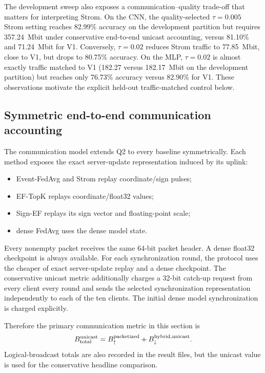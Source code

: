 The development sweep also exposes a communication--quality trade-off that matters for interpreting Strom. On the CNN, the quality-selected $\tau=0.005$ Strom setting reaches 82.99\% accuracy on the development partition but requires 357.24~Mbit under conservative end-to-end unicast accounting, versus 81.10\% and 71.24~Mbit for V1. Conversely, $\tau=0.02$ reduces Strom traffic to 77.85~Mbit, close to V1, but drops to 80.75\% accuracy. On the MLP, $\tau=0.02$ is almost exactly traffic matched to V1 (182.27 versus 182.17~Mbit on the development partition) but reaches only 76.73\% accuracy versus 82.90\% for V1. These observations motivate the explicit held-out traffic-matched control below.

\subsection{Symmetric end-to-end communication accounting}

The communication model extends Q2 to every baseline symmetrically. Each method exposes the exact server-update representation induced by its uplink:
\begin{itemize}
    \item Event-FedAvg and Strom replay coordinate/sign pulses;
    \item EF-TopK replays coordinate/float32 values;
    \item Sign-EF replays its sign vector and floating-point scale;
    \item dense FedAvg uses the dense model state.
\end{itemize}
Every nonempty packet receives the same 64-bit packet header. A dense float32 checkpoint is always available. For each synchronization round, the protocol uses the cheaper of exact server-update replay and a dense checkpoint. The conservative unicast metric additionally charges a 32-bit catch-up request from every client every round and sends the selected synchronization representation independently to each of the ten clients. The initial dense model synchronization is charged explicitly.

Therefore the primary communication metric in this section is
\begin{equation}
    B_{\rm total}^{\rm unicast}
    =B_{\uparrow}^{\rm packetized}+B_{\downarrow}^{\rm hybrid,unicast}.
\end{equation}
Logical-broadcast totals are also recorded in the result files, but the unicast value is used for the conservative headline comparison.

